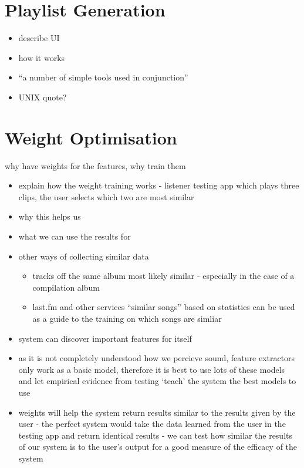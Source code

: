\section{Playlist Generation}
\begin{itemize}
	\item describe UI
	\item how it works
	\item ``a number of simple tools used in conjunction''
	\item UNIX quote?
\end{itemize}
\section{Weight Optimisation}
why have weights for the features, why train them
\begin{itemize}
	\item explain how the weight training works - listener testing app which plays three clips, the user selects which two are most similar
	\item why this helps us
	\item what we can use the results for
	\item other ways of collecting similar data
	\begin{itemize}
		\item tracks off the same album most likely similar - especially in the case of a compilation album
		\item last.fm and other services ``similar songs'' based on statistics can be used as a guide to the training on which songs are simliar
	\end{itemize}
\end{itemize}
\begin{itemize}
	\item system can discover important features for itself
	\item as it is not completely understood how we percieve sound, feature extractors only work as a basic model, therefore it is best to use lots of these models and let empirical evidence from testing `teach' the system the best models to use
	\item weights will help the system return results similar to the results given by the user - the perfect system would take the data learned from the user in the testing app and return identical results - we can test how similar the results of our system is to the user's output for a good measure of the efficacy of the system
\end{itemize}
